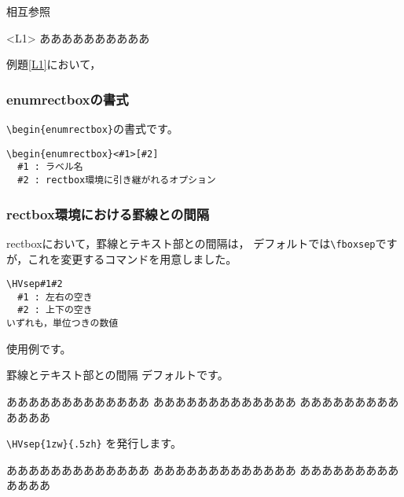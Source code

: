 \begin{showEx}{相互参照}
\def\labelrectboxenum{%
例題\arabic{rectboxenum}}
\begin{enumrectbox}<L1>
ああああああああああ
\end{enumrectbox}

\begin{enumrectbox}
例題\ref{L1}において，
\end{enumrectbox}
\end{showEx}

\subsubsection{\textsf{enumrectbox}の書式}
\verb+\begin{enumrectbox}+の書式です。

\begin{boxnote}
\begin{verbatim}
\begin{enumrectbox}<#1>[#2]
  #1 : ラベル名
  #2 : rectbox環境に引き継がれるオプション
\end{verbatim}
\end{boxnote}

\subsubsection{\textsf{rectbox}環境における罫線との間隔}
\textsf{rectbox}において，罫線とテキスト部との間隔は，
デフォルトでは\verb+\fboxsep+ですが，これを変更するコマンドを用意しました。

\begin{boxnote}
\begin{verbatim}
\HVsep#1#2
  #1 : 左右の空き
  #2 : 上下の空き
いずれも，単位つきの数値
\end{verbatim}
\end{boxnote}

使用例です。

\begin{showEx}{罫線とテキスト部との間隔}
デフォルトです。

\begin{rectbox}
あああああああああああああ
あああああああああああああ
あああああああああああああ
\end{rectbox}

\verb+\HVsep{1zw}{.5zh}+
を発行します。

\begin{rectbox}
あああああああああああああ
あああああああああああああ
あああああああああああああ
\end{rectbox}
\end{showEx}

